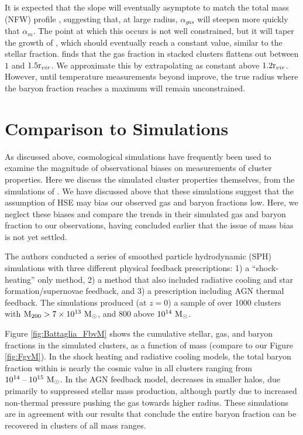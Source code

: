 It is expected that the slope will eventually asymptote to match the
total mass (NFW) profile \citep{Umetsu2009, Battaglia2013}, suggesting
that, at large radius, $\alpha_{gas}$ will steepen more quickly that
$\alpha_{m}$. The point at which this occurs is not well constrained,
but it will taper the growth of \fg{}, which should eventually reach a
constant value, similar to the stellar fraction.  \citet{PlanckIntV}
finds that the gas fraction in stacked \Planck{} clusters flattens out
between $1$ and $1.5\textrm{r\ensuremath{_{vir}}}{}$. We approximate this by extrapolating
\fg{} as constant above $1.2\textrm{r\ensuremath{_{vir}}}{}$. However, until temperature
measurements beyond \rfive{} improve, the true radius where the baryon
fraction reaches a maximum will remain unconstrained.

\section{Comparison to Simulations}
\label{sec:Simulations}

As discussed above, cosmological simulations have frequently been used
to examine the magnitude of observational biases on measurements of
cluster properties. Here we discuss the simulated cluster properties
themselves, from the simulations of \textbf{\citet{Battaglia2013}}. We
have discussed above that these simulations suggest that the
assumption of HSE may bias our observed gas and baryon fractions
low. Here, we neglect these biases and compare the trends in their
simulated gas and baryon fraction to our observations, having
concluded earlier that the issue of mass bias is not yet settled.

The authors conducted a series of smoothed particle hydrodynamic (SPH)
simulations with three different physical feedback prescriptions: 1) a
``shock-heating'' only method, 2) a method that also included
radiative cooling and star formation/supernovae feedback, and 3) a
prescription including AGN thermal feedback. The simulations produced
(at $z=0$) a sample of over 1000 clusters with $\textrm{M\ensuremath{_{200}}} >
7\times 10^{13}~\textrm{M}_\odot{}$, and 800 above $10^{14}~\textrm{M}_\odot{}$.



Figure \ref{fig:Battaglia_FbvM} shows the cumulative stellar, gas, and
baryon fractions in the simulated clusters, as a function of mass
(compare to our Figure \ref{fig:FgvM}). In the shock heating and
radiative cooling models, the total baryon fraction within
\rtwo{} is nearly the cosmic value in all clusters ranging from
$10^{14}\;\textrm{--}\;10^{15}~\textrm{M}_\odot{}$. In the AGN feedback model, \fb{}
decreases in smaller halos, due primarily to suppressed stellar mass
production, although partly due to increased non-thermal
pressure pushing the gas towards higher radius. These simulations are
in agreement with our results that conclude the entire baryon
fraction can be recovered in clusters of all mass ranges. 

